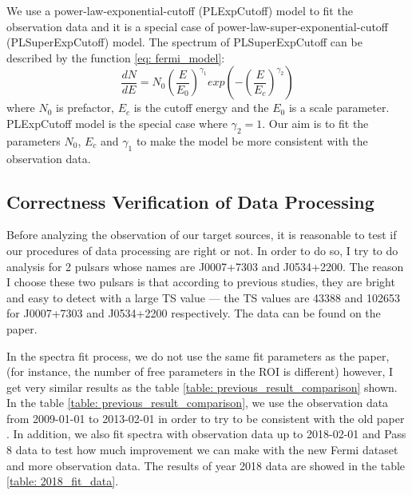 \documentclass[12pt]{report}
\begin{document}
        We use a power-law-exponential-cutoff (PLExpCutoff) model to fit the observation data and 
        it is a special case of power-law-super-exponential-cutoff (PLSuperExpCutoff) model. 
        The spectrum of PLSuperExpCutoff can be described by the function \ref{eq: fermi_model}:  
        \begin{equation} 
          \label{eq: fermi_model}
          \frac{dN}{dE} = N_{0} \left(\frac{E}{E_0}\right)^{\gamma_1} 
          exp\left(-\left(\frac{E}{E_c}\right)^{\gamma_2}\right)
        \end{equation}
        where $N_0$ is prefactor, $E_c$ is the cutoff energy and the $E_0$ is a scale parameter. 
        PLExpCutoff model is the special case where $\gamma_2=1$. Our aim is to fit the parameters 
        $N_0$, $E_c$ and $\gamma_1$ to make the model be more consistent with the observation data.

        \subsection{Correctness Verification of Data Processing}
          Before analyzing the observation of our target sources, it is reasonable to test if our procedures of 
          data processing are right or not. In order to do so, I try to do analysis for 
          2 pulsars whose names are J0007+7303 and J0534+2200. The reason I choose these two pulsars 
          is that according to previous studies, they are bright and easy to detect with a large TS value --- 
          the TS values are 43388 and 102653 for J0007+7303 and J0534+2200 respectively. 
          The data can be found on the paper. \cite{0067-0049-208-2-17} 

          In the spectra fit process, we do not use the same fit parameters as the paper, (for instance, 
          the number of free parameters in the ROI is different)
          however, I get very similar results as the table \ref{table: previous_result_comparison} shown. 
          In the table \ref{table: previous_result_comparison}, we use the observation data from 
          2009-01-01 to 2013-02-01 in order to try to be 
          consistent with the old paper \cite{0067-0049-208-2-17}. 
          In addition, we also fit spectra with observation data up to 2018-02-01 and Pass 8 data to test 
          how much improvement we can make with the new Fermi dataset and more observation data. 
          The results of year 2018 data are showed in the table \ref{table: 2018_fit_data}.
\end{document}
